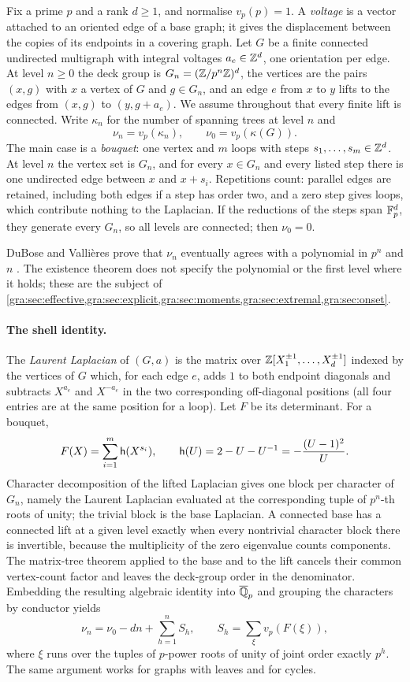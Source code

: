 Fix a prime $p$ and a rank $d\ge1$, and normalise $v_p(p)=1$. A
\emph{voltage} is a vector attached to an oriented edge of a base graph; it
gives the displacement between the copies of its endpoints in a covering
graph. Let $G$ be a finite connected undirected multigraph with integral
voltages $a_e\in\mathbb{Z}^d$, one orientation per edge. At level $n\ge0$ the deck
group is $G_n=(\mathbb{Z}/p^n\mathbb{Z})^d$, the vertices are the pairs $(x,g)$ with $x$ a
vertex of $G$ and $g\in G_n$, and an edge $e$ from $x$ to $y$ lifts to the
edges from $(x,g)$ to $(y,g+a_e)$. We assume throughout that every finite
lift is connected. Write $\kappa_n$ for the number of spanning trees at
level $n$ and
\[
 \nu_n=v_p(\kappa_n),\qquad \nu_0=v_p(\kappa(G)).
\]
The main case is a \emph{bouquet}: one vertex and $m$ loops with steps
$s_1,\dots,s_m\in\mathbb{Z}^d$. At level $n$ the vertex set is $G_n$, and for every
$x\in G_n$ and every listed step there is one undirected edge between $x$
and $x+s_i$. Repetitions count: parallel edges are retained, including both
edges if a step has order two, and a zero step gives loops, which contribute
nothing to the Laplacian. If the reductions of the steps span $\mathbb{F}_p^d$, they
generate every $G_n$, so all levels are connected; then $\nu_0=0$.

DuBose and Valli\`eres prove that $\nu_n$ eventually agrees with a
polynomial in $p^n$ and $n$ \cite[Theorem~6.2]{DuBoseVallieres2023Towers}.
The existence theorem does not specify the polynomial or the first level
where it holds; these are the subject of
\cref{gra:sec:effective,gra:sec:explicit,gra:sec:moments,gra:sec:extremal,gra:sec:onset}.

\paragraph{The shell identity.}
The \emph{Laurent Laplacian} of $(G,a)$ is the matrix over
$\mathbb{Z}[X_1^{\pm1},\dots,X_d^{\pm1}]$ indexed by the vertices of $G$ which, for
each edge $e$, adds $1$ to both endpoint diagonals and subtracts
$X^{a_e}$ and $X^{-a_e}$ in the two corresponding off-diagonal positions
(all four entries are at the same position for a loop). Let $F$ be its
determinant. For a bouquet,
\[
 F(X)=\sum_{i=1}^m\mathsf{h}(X^{s_i}),\qquad
 \mathsf{h}(U)=2-U-U^{-1}=-\frac{(U-1)^2}{U}.
\]
Character decomposition of the lifted Laplacian gives one block per
character of $G_n$, namely the Laurent Laplacian evaluated at the
corresponding tuple of $p^n$-th roots of unity; the trivial block is the
base Laplacian. A connected base has a connected lift at a given level
exactly when every nontrivial character block there is invertible, because
the multiplicity of the zero eigenvalue counts components. The matrix-tree
theorem applied to the base and to the lift cancels their common
vertex-count factor and leaves the deck-group order in the denominator.
Embedding the resulting algebraic identity into $\overline{\mathbb{Q}}_p$ and
grouping the characters by conductor yields
\begin{equation}\label{gra:eq:shells}
 \nu_n=\nu_0-dn+\sum_{h=1}^n S_h,\qquad
 S_h=\sum_{\xi}v_p(F(\xi)),
\end{equation}
where $\xi$ runs over the tuples of $p$-power roots of unity of joint order
exactly $p^h$. The same argument works for graphs with leaves and for
cycles.

